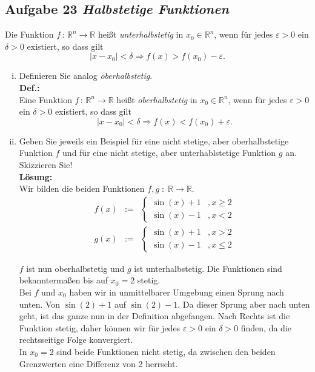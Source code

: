 \documentclass[11pt,a4paper,ngerman]{article}
\begin{document}
\subsection*{Aufgabe 23 \mdseries\itshape Halbstetige Funktionen}

Die Funktion $f \, : \, \mathbb{R}^n \rightarrow \mathbb{R}$ heißt \emph{unterhalbstetig} in $x_0 \in \mathbb{R}^n$, wenn für jedes $\varepsilon > 0$ ein $\delta > 0$ existiert, so dass gilt
	$$
		| x - x_0 | < \delta \Rightarrow f(x) > f(x_0) - \varepsilon.
	$$

\begin{enumerate}[(i)]
	\item Definieren Sie analog \emph{oberhalbstetig}.\\
	\textbf{Def.:}\\
		Eine Funktion $f \, : \, \mathbb{R}^n \rightarrow \mathbb{R}$ heißt \emph{oberhalbstetig} in $x_0 \in \mathbb{R}^n$, wenn für jedes
		$\varepsilon > 0$ ein $\delta > 0$ existiert, so dass gilt
		$$
			| x - x_0 | < \delta \Rightarrow f(x) < f(x_0) + \varepsilon.
		$$

	\item Geben Sie jeweils ein Beispiel für eine nicht stetige, aber oberhalbstetige Funktion $f$ und für eine nicht stetige, aber unterhablstetige 
		Funktion $g$ an. Skizzieren Sie!\\
	\textbf{Lösung:}\\
		Wir bilden die beiden Funktionen $f, g \; : \; \mathbb{R} \rightarrow \mathbb{R}$.\\
		$$\begin{array}{rcl}
			f(x) &:=& \left\{\begin{array}{lr}
				\sin(x) + 1 &, x \geq 2\\
				\sin(x) - 1 &, x < 2 
			\end{array}\right.\\
			g(x) &:=& \left\{\begin{array}{lr}
				\sin(x) + 1 &, x > 2\\
				\sin(x) - 1 &, x \leq 2 
			\end{array}\right.
		\end{array}$$
		
		$f$ ist nun oberhalbstetig und $g$ ist unterhalbstetig. Die Funktionen sind bekanntermaßen bis auf $x_0 = 2$ stetig.\\
		Bei $f$ und $x_0$ haben wir in unmittelbarer Umgebung einen Sprung nach unten. Von $\sin(2)+1$ auf $\sin(2) -1$. 
		Da dieser Sprung aber nach unten geht, ist das ganze nun in der Definition abgefangen. Nach Rechts ist die Funktion stetig,
		daher können wir für jedes $\varepsilon > 0$ ein $\delta > 0$ finden, da die rechtsseitige Folge konvergiert.\\
		In $x_0 = 2$ sind beide Funktionen nicht stetig, da zwischen den beiden Grenzwerten eine Differenz von 2 herrscht.\\


\end{enumerate}
\end{document}
